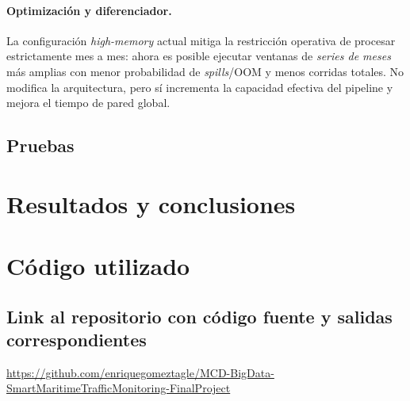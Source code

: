 \documentclass[10pt]{article}
\begin{document}
\paragraph{Optimización y diferenciador.}
La configuración \emph{high-memory} actual mitiga la restricción operativa de procesar estrictamente mes a mes: ahora es posible ejecutar ventanas de \emph{series de meses} más amplias con menor probabilidad de \textit{spills}/OOM y menos corridas totales. No modifica la arquitectura, pero sí incrementa la capacidad efectiva del pipeline y mejora el tiempo de pared global.
\subsection{Pruebas} %
\section{Resultados y conclusiones} %
\section{Código utilizado} %
\subsection{Link al repositorio con código fuente y salidas correspondientes}
\url{https://github.com/enriquegomeztagle/MCD-BigData-SmartMaritimeTrafficMonitoring-FinalProject}
\end{document}
